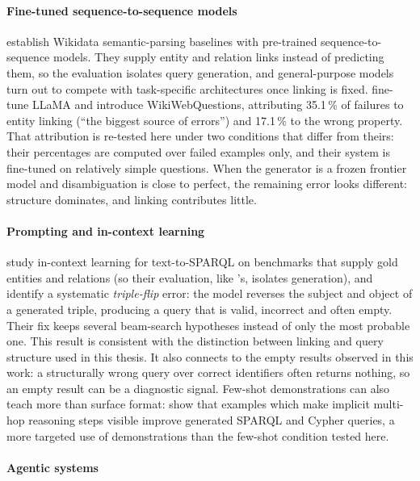 \paragraph{Fine-tuned sequence-to-sequence
models}

\citet{banerjee2022modern} establish Wikidata semantic-parsing baselines with pre-trained sequence-to-sequence models.
They supply entity and relation links instead of predicting them, so the evaluation isolates query generation, and general-purpose models turn out to compete with task-specific architectures once linking is fixed.
\citet{xu2023wikisp} fine-tune LLaMA and introduce WikiWebQuestions, attributing 35.1\,\% of failures to entity linking (``the biggest source of errors'') and 17.1\,\% to the wrong property.
That attribution is re-tested here under two conditions that differ from theirs: their percentages are computed over failed examples only, and their system is fine-tuned on relatively simple questions.
When the generator is a frozen frontier model and disambiguation is close to perfect, the remaining error looks different: structure dominates, and linking contributes little.

\paragraph{Prompting and in-context
learning}

\citet{dabramo2025investigating} study in-context learning for text-to-SPARQL on benchmarks that supply gold entities and relations (so their evaluation, like \citet{banerjee2022modern}'s, isolates generation), and identify a systematic \emph{triple-flip} error: the model reverses the subject and object of a generated triple, producing a query that is valid, incorrect and often empty.
Their fix keeps several beam-search hypotheses instead of only the most probable one. This result is consistent with the distinction between linking and query structure used in this thesis. It also connects to the empty results observed in this work: a structurally wrong query over correct identifiers often returns nothing, so an empty result can be a diagnostic signal.
Few-shot demonstrations can also teach more than surface format: \citet{shah2024implicit} show that examples which make implicit multi-hop reasoning steps visible improve generated SPARQL and Cypher queries, a more targeted use of demonstrations than the few-shot condition tested here.

\paragraph{Agentic systems}

